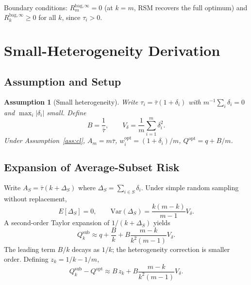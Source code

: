 \documentclass[12pt,a4paper]{article}
\newtheorem{assumption}{Assumption}
\theoremstyle{definition}
\begin{document}
Boundary conditions: $R_m^{\mathrm{bag},\infty}=0$ (at $k=m$, RSM recovers
the full optimum) and $R_k^{\mathrm{bag},\infty}\geq 0$ for all $k$, since
$\tau_i>0$.

\section{Small-Heterogeneity Derivation}
\label{sec:smallhet}

\subsection{Assumption and Setup}

\begin{assumption}[Small heterogeneity]\label{ass:sh}
Write $\tau_i=\bar\tau(1+\delta_i)$ with $m^{-1}\sum_i\delta_i=0$ and
$\max_i|\delta_i|$ small. Define
\begin{equation}
B = \frac{1}{\bar\tau}, \qquad
V_\delta = \frac{1}{m}\sum_{i=1}^m\delta_i^2.
\end{equation}
Under Assumption~\ref{ass:cl},
$A_m=m\bar\tau$, $w_i^{\mathrm{opt}}=(1+\delta_i)/m$, $Q^{\mathrm{opt}}=q+B/m$.
\end{assumption}

\subsection{Expansion of Average-Subset Risk}

Write $A_S=\bar\tau(k+\Delta_S)$ where $\Delta_S=\sum_{i\in S}\delta_i$.
Under simple random sampling without replacement,
\begin{equation}
E[\Delta_S]=0, \qquad
\mathrm{Var}(\Delta_S)=\frac{k(m-k)}{m-1}V_\delta.
\end{equation}
A second-order Taylor expansion of $1/(k+\Delta_S)$ yields
\begin{equation}\label{eq:Qsub_approx}
Q_k^{\mathrm{sub}} \approx q + \frac{B}{k} + B\frac{m-k}{k^2(m-1)}V_\delta.
\end{equation}
The leading term $B/k$ decays as $1/k$; the heterogeneity correction is
smaller order. Defining $z_k=1/k-1/m$,
\begin{equation}\label{eq:Qsub_leading}
Q_k^{\mathrm{sub}} - Q^{\mathrm{opt}} \approx B\,z_k
+ B\frac{m-k}{k^2(m-1)}V_\delta.
\end{equation}
\end{document}
